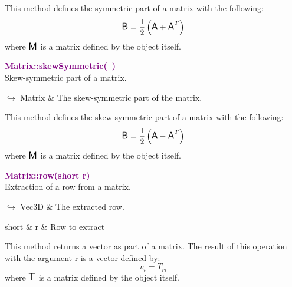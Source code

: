 This method defines the symmetric part of a matrix with the following:
\begin{equation*}
\mbox{\large\ensuremath{\mathsf{B}}} = \frac{1}{2} \left( \mbox{\large\ensuremath{\mathsf{A}}} + \mbox{\large\ensuremath{\mathsf{A}}}^T \right)
\end{equation*}
where $\mbox{\large\ensuremath{\mathsf{M}}}$ is a matrix defined by the object itself.

\textcolor{purple}{\textbf{Matrix::skewSymmetric(~)}}\label{Matrix::skewSymmetric()}\\
Skew-symmetric part of a matrix.\vspace*{-0.5em}
\begin{tcolorbox}[grow to left by=-1cm, width=\textwidth-1cm,myArgs,tabularx={l|R}]
$\hookrightarrow$ Matrix & The skew-symmetric part of the matrix.
\end{tcolorbox}

This method defines the skew-symmetric part of a matrix with the following:
\begin{equation*}
\mbox{\large\ensuremath{\mathsf{B}}} = \frac{1}{2} \left( \mbox{\large\ensuremath{\mathsf{A}}} - \mbox{\large\ensuremath{\mathsf{A}}}^T \right)
\end{equation*}
where $\mbox{\large\ensuremath{\mathsf{M}}}$ is a matrix defined by the object itself.

\textcolor{purple}{\textbf{Matrix::row(short r)}}\label{Matrix::row(short r)}\\
Extraction of a row from a matrix.\vspace*{-0.5em}
\begin{tcolorbox}[grow to left by=-1cm, width=\textwidth-1cm,myArgs,tabularx={l|R}]
$\hookrightarrow$ Vec3D & The extracted row.
\end{tcolorbox}

\begin{tcolorbox}[width=\textwidth,myArgs,tabularx={ll|R}]
short & r & Row to extract
\end{tcolorbox}

This method returns a vector as part of a matrix.
The result of this operation with the argument r is a vector defined by:
\begin{equation*}
v_{i} = T_{ri}
\end{equation*}
where $\mbox{\large\ensuremath{\mathsf{T}}}$ is a matrix defined by the object itself.

